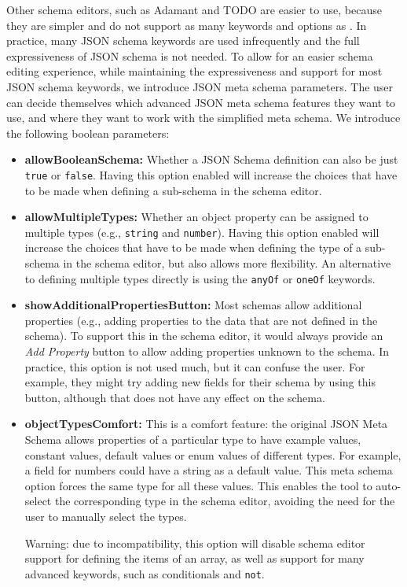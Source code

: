Other schema editors, such as Adamant \cite{todo} and TODO are easier to use, because they are simpler and do not support as many keywords and options as \toolname{}. 
In practice, many JSON schema keywords are used infrequently\cite{baazizi2021empirical} and the full expressiveness of JSON schema is not needed.
To allow for an easier schema editing experience, while maintaining the expressiveness and support for most JSON schema keywords, we introduce JSON meta schema parameters.
The user can decide themselves which advanced JSON meta schema features they want to use, and where they want to work with the simplified meta schema.
We introduce the following boolean parameters:
\begin{itemize}
	\item \textbf{allowBooleanSchema:} Whether a JSON Schema definition can also be just \texttt{true} or \texttt{false}. Having this option enabled will increase the choices that have to be made when defining a sub-schema in the schema editor.
	\item \textbf{allowMultipleTypes:} Whether an object property can be assigned to multiple types (e.g., \texttt{string} and \texttt{number}). Having this option enabled will increase the choices that have to be made when defining the type of a sub-schema in the schema editor, but also allows more flexibility. An alternative to defining multiple types directly is using the \texttt{anyOf} or \texttt{oneOf} keywords.
	\item \textbf{showAdditionalPropertiesButton:} Most schemas allow additional properties (e.g., adding properties to the data that are not defined in the schema). To support this in the schema editor, it would always provide an \textit{Add Property} button to allow adding properties unknown to the schema. In practice, this option is not used much, but it can confuse the user. For example, they might try adding new fields for their schema by using this button, although that does not have any effect on the schema.
	\item \textbf{objectTypesComfort:} This is a comfort feature: the original JSON Meta Schema allows properties of a particular type to have example values, constant values, default values or enum values of different types. For example, a field for numbers could have a string as a default value. This meta schema option forces the same type for all these values. This enables the tool to auto-select the corresponding type in the schema editor, avoiding the need for the user to manually select the types. 
	
	Warning: due to incompatibility, this option will disable schema editor support for defining the items of an array, as well as support for many advanced keywords, such as conditionals and \texttt{not}.
\end{itemize}
